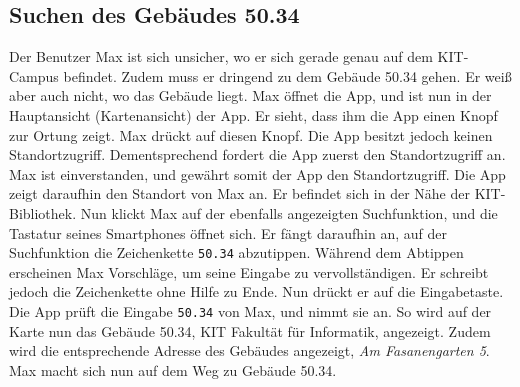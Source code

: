 \subsection{Suchen des Gebäudes 50.34}

Der Benutzer Max ist sich unsicher, wo er sich gerade genau auf dem KIT-Campus befindet.
Zudem muss er dringend zu dem Gebäude 50.34 gehen.
Er weiß aber auch nicht, wo das Gebäude liegt.
Max öffnet die App, und ist nun in der Hauptansicht (Kartenansicht) der App.
Er sieht, dass ihm die App einen Knopf zur Ortung zeigt.
Max drückt auf diesen Knopf.
Die App besitzt jedoch keinen Standortzugriff.
Dementsprechend fordert die App zuerst den Standortzugriff an.
Max ist einverstanden, und gewährt somit der App den Standortzugriff.
Die App zeigt daraufhin den Standort von Max an.
Er befindet sich in der Nähe der KIT-Bibliothek.
Nun klickt Max auf der ebenfalls angezeigten Suchfunktion, und die Tastatur seines Smartphones öffnet sich.
Er fängt daraufhin an, auf der Suchfunktion die Zeichenkette \texttt{50.34} abzutippen. 
Während dem Abtippen erscheinen Max Vorschläge, um seine Eingabe zu vervollständigen. 
Er schreibt jedoch die Zeichenkette ohne Hilfe zu Ende. 
Nun drückt er auf die Eingabetaste. 
Die App prüft die Eingabe \texttt{50.34} von Max, und nimmt sie an. 
So wird auf der Karte nun das Gebäude 50.34, KIT Fakultät für Informatik, angezeigt. 
Zudem wird die entsprechende Adresse des Gebäudes angezeigt, \textit{Am Fasanengarten 5}. 
Max macht sich nun auf dem Weg zu Gebäude 50.34.